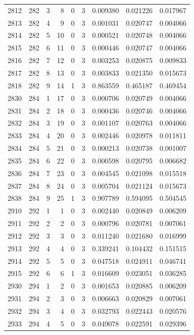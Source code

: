 \begin{longtable}{rrrrrrrrr}
2812 & 282 & 3 & 8 & 0 & 3 & 0.009380 & 0.021226 & 0.017967 \\
2813 & 282 & 4 & 9 & 0 & 3 & 0.001031 & 0.020747 & 0.004066 \\
2814 & 282 & 5 & 10 & 0 & 3 & 0.000521 & 0.020748 & 0.004066 \\
2815 & 282 & 6 & 11 & 0 & 3 & 0.000446 & 0.020747 & 0.004066 \\
2816 & 282 & 7 & 12 & 0 & 3 & 0.003253 & 0.020875 & 0.009833 \\
2817 & 282 & 8 & 13 & 0 & 3 & 0.003833 & 0.021350 & 0.015673 \\
2818 & 282 & 9 & 14 & 1 & 3 & 0.863559 & 0.465187 & 0.469454 \\
2830 & 284 & 1 & 17 & 0 & 3 & 0.000706 & 0.020749 & 0.004066 \\
2831 & 284 & 2 & 18 & 0 & 3 & 0.000436 & 0.020746 & 0.004066 \\
2832 & 284 & 3 & 19 & 0 & 3 & 0.001107 & 0.020763 & 0.004066 \\
2833 & 284 & 4 & 20 & 0 & 3 & 0.002446 & 0.020978 & 0.011811 \\
2834 & 284 & 5 & 21 & 0 & 3 & 0.000213 & 0.020738 & 0.001007 \\
2835 & 284 & 6 & 22 & 0 & 3 & 0.000598 & 0.020795 & 0.006682 \\
2836 & 284 & 7 & 23 & 0 & 3 & 0.004545 & 0.021098 & 0.015518 \\
2837 & 284 & 8 & 24 & 0 & 3 & 0.005704 & 0.021124 & 0.015673 \\
2838 & 284 & 9 & 25 & 1 & 3 & 0.907789 & 0.594095 & 0.504545 \\
2910 & 292 & 1 & 1 & 0 & 3 & 0.002440 & 0.020849 & 0.006209 \\
2911 & 292 & 2 & 2 & 0 & 3 & 0.000796 & 0.020781 & 0.007061 \\
2912 & 292 & 3 & 3 & 0 & 3 & 0.011240 & 0.021680 & 0.016999 \\
2913 & 292 & 4 & 4 & 0 & 3 & 0.339241 & 0.104432 & 0.151515 \\
2914 & 292 & 5 & 5 & 0 & 3 & 0.047518 & 0.024911 & 0.046741 \\
2915 & 292 & 6 & 6 & 1 & 3 & 0.016609 & 0.023051 & 0.036285 \\
2930 & 294 & 1 & 2 & 0 & 3 & 0.001653 & 0.020885 & 0.006209 \\
2931 & 294 & 2 & 3 & 0 & 3 & 0.006663 & 0.020829 & 0.007061 \\
2932 & 294 & 3 & 4 & 0 & 3 & 0.032793 & 0.022443 & 0.020576 \\
2933 & 294 & 4 & 5 & 0 & 3 & 0.049078 & 0.022591 & 0.029396 \\

\end{longtable}
